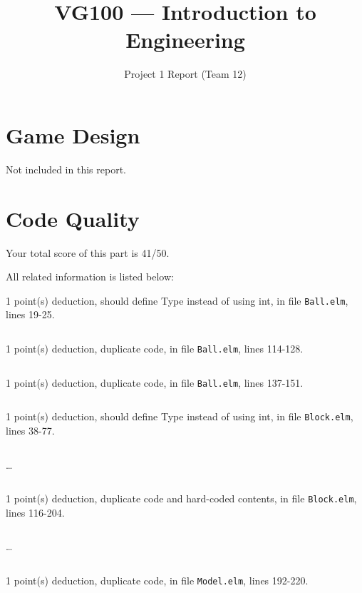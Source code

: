 \documentclass{article}
\title{VG100 --- Introduction to\\ Engineering}
\subtitle{Project 1 Report (Team 12)}
\begin{document}
\maketitle

\section{Game Design}

Not included in this report.

\section{Code Quality}

Your total score of this part is 41/50. \medskip

All related information is listed below: \medskip

1 point(s) {\color{red}deduction}, should define Type instead of using int, in file {\color{blue}\texttt{Ball.elm}}, lines {\color{blue}19-25}.

\inputminted[firstline=19,lastline=25]{elm}{Ball.elm}

1 point(s) {\color{red}deduction}, duplicate code, in file {\color{blue}\texttt{Ball.elm}}, lines {\color{blue}114-128}.

\inputminted[firstline=114,lastline=128]{elm}{Ball.elm}

1 point(s) {\color{red}deduction}, duplicate code, in file {\color{blue}\texttt{Ball.elm}}, lines {\color{blue}137-151}.

\inputminted[firstline=137,lastline=151]{elm}{Ball.elm}

1 point(s) {\color{red}deduction}, should define Type instead of using int, in file {\color{blue}\texttt{Block.elm}}, lines {\color{blue}38-77}.

\inputminted[firstline=38,lastline=47]{elm}{Block.elm}

\dots

\inputminted[firstline=68,lastline=77]{elm}{Block.elm}

1 point(s) {\color{red}deduction}, duplicate code and hard-coded contents, in file {\color{blue}\texttt{Block.elm}}, lines {\color{blue}116-204}.

\inputminted[firstline=116,lastline=125]{elm}{Block.elm}

\dots

\inputminted[firstline=195,lastline=204]{elm}{Block.elm}

1 point(s) {\color{red}deduction}, duplicate code, in file {\color{blue}\texttt{Model.elm}}, lines {\color{blue}192-220}.
\end{document}
